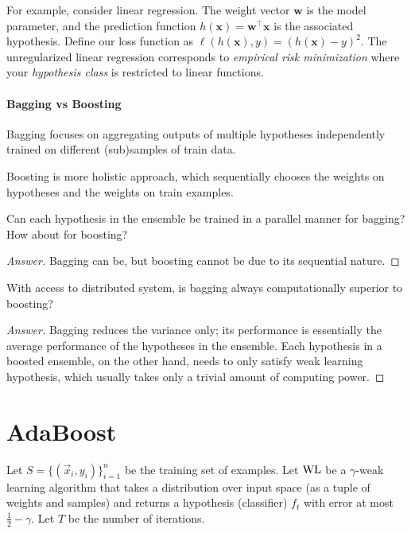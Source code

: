 \documentclass{discussion}
\newenvironment{answer}
  {\vspace{-1em}\begin{proof}[Answer]}
  {\end{proof}}
\begin{document}
For example, consider linear regression. The weight vector $\mathbf{w}$ is the model parameter, and the prediction function $h(\mathbf{x}) = \mathbf{w}^\top \mathbf{x}$ is the associated hypothesis. Define our loss function as $\ell(h(\mathbf{x}), y) = (h(\mathbf{x}) - y)^2$. The unregularized linear regression corresponds to \emph{empirical risk minimization} where your \emph{hypothesis class} is restricted to linear functions.

\paragraph{Bagging vs Boosting} Bagging focuses on aggregating outputs of multiple hypotheses independently trained on different (sub)samples of train data. 

Boosting is more holistic approach, which sequentially chooses the weights on hypotheses and the weights on train examples. 

\begin{exercise}
Can each hypothesis in the ensemble be trained in a parallel manner for bagging? How about for boosting?
\end{exercise}
\begin{answer}
Bagging can be, but boosting cannot be due to its sequential nature.
\end{answer}


\begin{exercise}
With access to distributed system, is bagging always computationally superior to boosting?
\end{exercise}
\begin{answer}
  Bagging reduces the variance only; its performance is essentially the average performance of the hypotheses in the ensemble. Each hypothesis in a boosted ensemble, on the other hand, needs to only satisfy weak learning hypothesis, which usually takes only a trivial amount of computing power.
\end{answer}

\section{AdaBoost}
Let $S = \{(\vec{x}_i, y_i)\}_{i=1}^{n}$ be the training set of examples. Let $\mathrm{WL}$ be a $\gamma$-weak learning algorithm that takes a distribution over input space (as a tuple of weights and samples) and returns a hypothesis (classifier) $f_t$ with error at most $\frac{1}{2} - \gamma$. Let $T$ be the number of iterations.
\end{document}

